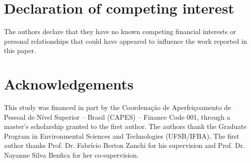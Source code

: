 \documentclass[a4paper,fleqn]{cas-sc}
\begin{document}
\section*{Declaration of competing interest}
The authors declare that they have no known competing financial interests or personal relationships that could have appeared to influence the work reported in this paper.

\section*{Acknowledgements}
This study was financed in part by the Coordenação de Aperfeiçoamento de Pessoal de Nível Superior -- Brasil (CAPES) -- Finance Code 001, through a master's scholarship granted to the first author. The authors thank the Graduate Program in Environmental Sciences and Technologies (UFSB/IFBA). The first author thanks Prof. Dr. Fabrício Berton Zanchi for his supervision and Prof. Dr. Nayanne Silva Benfica for her co-supervision.

\printcredits



\end{document}
